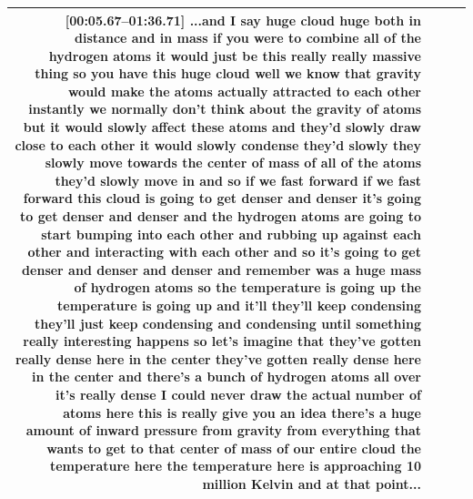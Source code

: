 \documentclass[10pt]{article}
\begin{document}
\begin{tiny}
\begin{longtable}{|r|p{0.375in}|p{1.275in}|p{3.5in}|}
                                                                                                                                                                                                                                                                                         \textbf{[00:05.67--01:36.71]} ...and I say huge cloud huge both in distance and in mass if you were to combine all of the hydrogen atoms it would just be this really really massive thing so you have this huge cloud well we know that gravity would make the atoms actually attracted to each other instantly we normally don't think about the gravity of atoms but it would slowly affect these atoms and they'd slowly draw close to each other it would slowly condense they'd slowly they slowly move towards the center of mass of all of the atoms they'd slowly move in and so if we fast forward if we fast forward this cloud is going to get denser and denser it's going to get denser and denser and the hydrogen atoms are going to start bumping into each other and rubbing up against each other and interacting with each other and so it's going to get denser and denser and denser and remember was a huge mass of hydrogen atoms so the temperature is going up the temperature is going up and it'll they'll keep condensing they'll just keep condensing and condensing until something really interesting happens so let's imagine that they've gotten really dense here in the center they've gotten really dense here in the center and there's a bunch of hydrogen atoms all over it's really dense I could never draw the actual number of atoms here this is really give you an idea there's a huge amount of inward pressure from gravity from everything that wants to get to that center of mass of our entire cloud the temperature here the temperature here is approaching 10 million Kelvin and at that point... \\\hline

\end{longtable}
\end{tiny}
\end{document}
